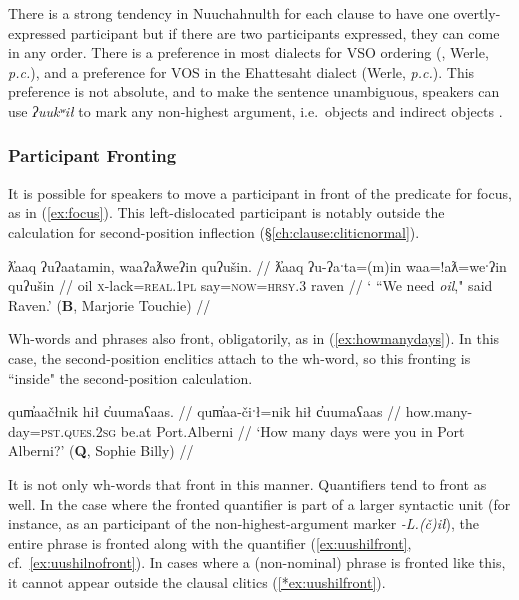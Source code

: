 
There is a strong tendency in Nuuchahnulth for each clause to have one overtly-expressed participant \citep[p.~38]{rose1981} but if there are two participants expressed, they can come in any order. There is a preference in most dialects for VSO ordering (\citet[p.~267]{jacobsen1993}, Werle, \textit{p.c.}), and a preference for VOS in the Ehattesaht dialect (Werle, \textit{p.c.}). This preference is not absolute, and to make the sentence unambiguous, speakers can use \textit{ʔuukʷił} to mark any non-highest argument, i.e.\ objects and indirect objects \citep{woo2007b, woo2007a}.

\subsubsection{Participant Fronting} \label{ch:clause:fronting}

It is possible for speakers to move a participant in front of the predicate for focus, as in (\ref{ex:focus}). This left-dislocated participant is notably outside the calculation for second-position inflection (\S\ref{ch:clause:cliticnormal}).

\ex \label{ex:focus}
\begingl
\glpreamble ƛ̓aaq ʔuʔaatamin, waaʔaƛweʔin quʔušin. //
\gla ƛ̓aaq ʔu-ʔaˑta=(m)in waa=!aƛ=weˑʔin quʔušin //
\glb oil \textsc{x}-lack=\textsc{real.1pl} say=\textsc{now}=\textsc{hrsy.3} raven //
\glft ` ``We need \textit{oil}," said Raven.' (\textbf{B}, Marjorie Touchie) //
\endgl
\xe

Wh-words and phrases also front, obligatorily, as in (\ref{ex:howmanydays}). In this case, the second-position enclitics attach to the wh-word, so this fronting is ``inside" the second-position calculation.

\ex \label{ex:howmanydays}
\begingl
\glpreamble qum̓aačłnik hił c̓uumaʕaas. //
\gla qum̓aa-čiˑł=nik hił c̓uumaʕaas //
\glb how.many-day=\textsc{pst.ques.2sg} be.at Port.Alberni //
\glft `How many days were you in Port Alberni?' (\textbf{Q}, Sophie Billy) //
\endgl
\xe

It is not only wh-words that front in this manner. Quantifiers tend to front as well. In the case where the fronted quantifier is part of a larger syntactic unit (for instance, as an participant of the non-highest-argument marker \textit{-L.(č)ił}), the entire phrase is fronted along with the quantifier (\ref{ex:uushilfront}, cf.\ \ref{ex:uushilnofront}). In cases where a (non-nominal) phrase is fronted like this, it cannot appear outside the clausal clitics (\ref{*ex:uushilfront}).

